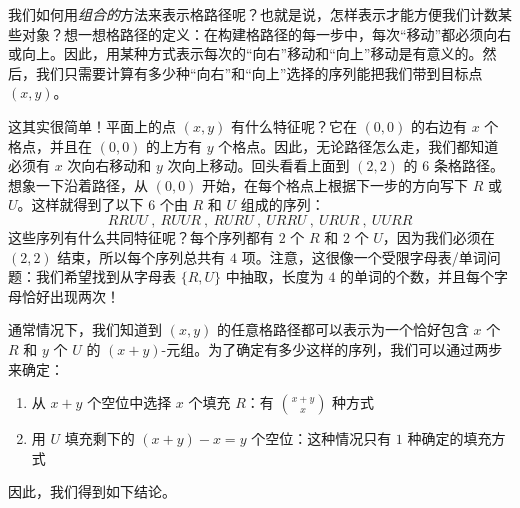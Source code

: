 \begin{example}
\begin{center}
    \end{center}
    我们如何用\emph{组合的}方法来表示格路径呢？也就是说，怎样表示才能方便我们计数某些对象？想一想格路径的定义：在构建格路径的每一步中，每次``移动''都必须向右或向上。因此，用某种方式表示每次的``向右''移动和``向上''移动是有意义的。然后，我们只需要计算有多少种``向右''和``向上''选择的序列能把我们带到目标点 $(x, y)$。

    这其实很简单！平面上的点 $(x, y)$ 有什么特征呢？它在 $(0, 0)$ 的右边有 $x$ 个格点，并且在 $(0, 0)$ 的上方有 $y$ 个格点。因此，无论路径怎么走，我们都知道必须有 $x$ 次向右移动和 $y$ 次向上移动。回头看看上面到 $(2, 2)$ 的 $6$ 条格路径。想象一下沿着路径，从 $(0, 0)$ 开始，在每个格点上根据下一步的方向写下 $R$ 或 $U$。这样就得到了以下 $6$ 个由 $R$ 和 $U$ 组成的序列：
    \[RRUU \:,\: RUUR \:,\: RURU \:,\: URRU \:,\: URUR \:,\: UURR\]
    这些序列有什么共同特征呢？每个序列都有 $2$ 个 $R$ 和 $2$ 个 $U$，因为我们必须在 $(2,2)$ 结束，所以每个序列总共有 $4$ 项。注意，这很像一个受限字母表/单词问题：我们希望找到从字母表 $\{R,U\}$ 中抽取，长度为 $4$ 的单词的个数，并且每个字母恰好出现两次！

    通常情况下，我们知道到 $(x, y)$ 的任意格路径都可以表示为一个恰好包含 $x$ 个 $R$ 和 $y$ 个 $U$ 的 $(x + y)$-元组。为了确定有多少这样的序列，我们可以通过两步来确定：
    \begin{enumerate}
        \item 从 $x + y$ 个空位中选择 $x$ 个填充 $R$：有 ${x+y \choose x}$ 种方式
        \item 用 $U$ 填充剩下的 $(x + y) - x = y$ 个空位：这种情况只有 $1$ 种确定的填充方式
    \end{enumerate}
    因此，我们得到如下结论。


\end{example}
